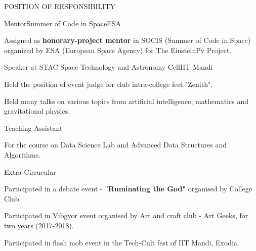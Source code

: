 \documentclass{resume} %
\begin{document}
\begin{rSection}{POSITION OF RESPONSIBILITY}
\begin{rSubsection}{Mentor}{}{Summer of Code in Space}{ESA}
\item  Assigned as \textbf{honorary-project mentor} in SOCIS (Summer of
Code in Space) organized by ESA (European Space Agency) for
The EinsteinPy Project.
\end{rSubsection}

\begin{rSubsection}{Speaker at STAC }{}{Space Technology and Astronomy Cell}{IIT Mandi}
\item Held the position of event judge for club intra-college fest "Zenith".
\item Held many talks on various topics from artificial intelligence, mathematics and gravitational physics.
\end{rSubsection}

\begin{rSubsection}{Teaching Assistant}{}{}{}
\item For the course on Data Science Lab and Advanced Data Structures and Algorithms.
\end{rSubsection}

\end{rSection}
\newpage
\begin{rSection}{Extra-Cirrucular} \itemsep -3pt
\item Participated in a debate event - \textbf{"Ruminating the God"} organised by College Club.
\item Participated in Vibgyor event organised by Art and craft club - Art Geeks, for two years (2017-2018).
\item Participated in flash mob event in the Tech-Cult fest of IIT Mandi, Exodia.

\end{rSection}
\end{document}
